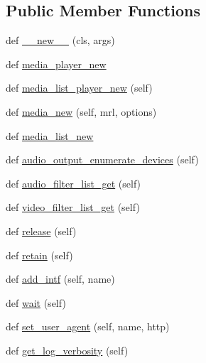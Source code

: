 \subsection*{Public Member Functions}
\begin{DoxyCompactItemize}
\item 
def \hyperlink{classsrc_1_1lib_1_1vlc_1_1Instance_a6049b5b5c8f5fad4997792e385f1c28b}{\+\_\+\+\_\+new\+\_\+\+\_\+} (cls, args)
\item 
def \hyperlink{classsrc_1_1lib_1_1vlc_1_1Instance_acb31890e7aaf36575e5ec23e7f6ca562}{media\+\_\+player\+\_\+new}
\item 
def \hyperlink{classsrc_1_1lib_1_1vlc_1_1Instance_a7433bcf39b10294cea277502fc72a019}{media\+\_\+list\+\_\+player\+\_\+new} (self)
\item 
def \hyperlink{classsrc_1_1lib_1_1vlc_1_1Instance_a1826a97d104c70587f6f4d7fab96bc81}{media\+\_\+new} (self, mrl, options)
\item 
def \hyperlink{classsrc_1_1lib_1_1vlc_1_1Instance_a44f4fed61bc7bd5920d22f8d7e76ab77}{media\+\_\+list\+\_\+new}
\item 
def \hyperlink{classsrc_1_1lib_1_1vlc_1_1Instance_a91a264abf7ab8cad552a220d38f196fb}{audio\+\_\+output\+\_\+enumerate\+\_\+devices} (self)
\item 
def \hyperlink{classsrc_1_1lib_1_1vlc_1_1Instance_a31b2561af371b849d9711cf5309a205e}{audio\+\_\+filter\+\_\+list\+\_\+get} (self)
\item 
def \hyperlink{classsrc_1_1lib_1_1vlc_1_1Instance_a64321333499e43756da7700a21d58222}{video\+\_\+filter\+\_\+list\+\_\+get} (self)
\item 
def \hyperlink{classsrc_1_1lib_1_1vlc_1_1Instance_a33a79d739d9f61b91291cc6c6c57f20e}{release} (self)
\item 
def \hyperlink{classsrc_1_1lib_1_1vlc_1_1Instance_ab25ffc3a1331b995a8a7429a7a723746}{retain} (self)
\item 
def \hyperlink{classsrc_1_1lib_1_1vlc_1_1Instance_a62258039d44d774f30a922b57a554bf6}{add\+\_\+intf} (self, name)
\item 
def \hyperlink{classsrc_1_1lib_1_1vlc_1_1Instance_ad5ebe431463762bf765d57068920d05b}{wait} (self)
\item 
def \hyperlink{classsrc_1_1lib_1_1vlc_1_1Instance_a3c3df71ad6ccfa88cbb049866ad48797}{set\+\_\+user\+\_\+agent} (self, name, http)
\item 
def \hyperlink{classsrc_1_1lib_1_1vlc_1_1Instance_a94eb5e7343a37a53a95a92f65805445d}{get\+\_\+log\+\_\+verbosity} (self)
\item 

\end{DoxyCompactItemize}
